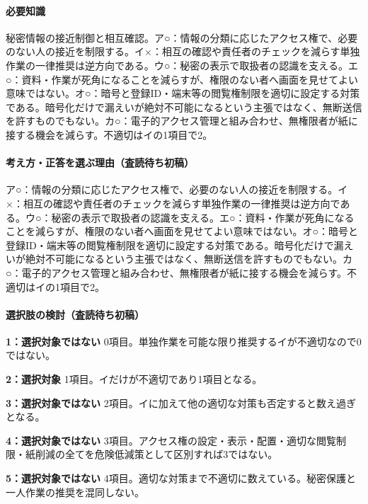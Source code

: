 \paragraph{必要知識} 秘密情報の接近制御と相互確認。ア○：情報の分類に応じたアクセス権で、必要のない人の接近を制限する。イ×：相互の確認や責任者のチェックを減らす単独作業の一律推奨は逆方向である。ウ○：秘密の表示で取扱者の認識を支える。エ○：資料・作業が死角になることを減らすが、権限のない者へ画面を見せてよい意味ではない。オ○：暗号と登録ID・端末等の閲覧権制限を適切に設定する対策である。暗号化だけで漏えいが絶対不可能になるという主張ではなく、無断送信を許すものでもない。カ○：電子的アクセス管理と組み合わせ、無権限者が紙に接する機会を減らす。不適切はイの1項目で2。

\paragraph{考え方・正答を選ぶ理由（査読待ち初稿）} ア○：情報の分類に応じたアクセス権で、必要のない人の接近を制限する。イ×：相互の確認や責任者のチェックを減らす単独作業の一律推奨は逆方向である。ウ○：秘密の表示で取扱者の認識を支える。エ○：資料・作業が死角になることを減らすが、権限のない者へ画面を見せてよい意味ではない。オ○：暗号と登録ID・端末等の閲覧権制限を適切に設定する対策である。暗号化だけで漏えいが絶対不可能になるという主張ではなく、無断送信を許すものでもない。カ○：電子的アクセス管理と組み合わせ、無権限者が紙に接する機会を減らす。不適切はイの1項目で2。

\paragraph{選択肢の検討（査読待ち初稿）}\mbox{}\par

\noindent\textbf{1：選択対象ではない} 0項目。単独作業を可能な限り推奨するイが不適切なので0ではない。\par

\noindent\textbf{2：選択対象} 1項目。イだけが不適切であり1項目となる。\par

\noindent\textbf{3：選択対象ではない} 2項目。イに加えて他の適切な対策も否定すると数え過ぎとなる。\par

\noindent\textbf{4：選択対象ではない} 3項目。アクセス権の設定・表示・配置・適切な閲覧制限・紙削減の全てを危険低減策として区別すれば3ではない。\par

\noindent\textbf{5：選択対象ではない} 4項目。適切な対策まで不適切に数えている。秘密保護と一人作業の推奨を混同しない。\par

